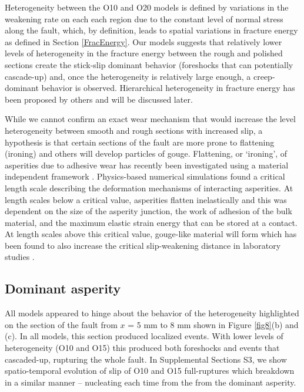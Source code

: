 \documentclass[preprint,1p, 10pt,authoryear]{elsarticle}
\begin{document}
Heterogeneity between the O10 and O20 models is defined by variations in the weakening rate on each each region due to the constant level of normal stress along the fault, which, by definition, leads to spatial variations in fracture energy as defined in Section \ref{FracEnergy}. Our models suggests that relatively lower levels of heterogeneity in the fracture energy between the rough and polished sections create the stick-slip dominant behavior (foreshocks that can potentially cascade-up) and, once the heterogeneity is relatively large enough, a creep-dominant behavior is observed. Hierarchical heterogeneity in fracture energy has been proposed by others \citep{Ide2005, Aochi2014, Aochi2017} and will be discussed later.

While we cannot confirm an exact wear mechanism that would increase the level heterogeneity between smooth and rough sections with increased slip, a hypothesis is that certain sections of the fault are more prone to flattening (ironing) and others will develop particles of gouge. Flattening, or ‘ironing’, of asperities due to adhesive wear has recently been investigated using a material independent framework \citet{Aghababaei2016}. Physics-based numerical simulations found a critical length scale describing the deformation mechanisms of interacting asperities. At length scales below a critical value, asperities flatten inelastically and this was dependent on the size of the asperity junction, the work of adhesion of the bulk material, and the maximum elastic strain energy that can be stored at a contact. At length scales above this critical value, gouge-like material will form which has been found to also increase the critical slip-weakening distance in laboratory studies \citep{Marone1998}.   

\subsection{Dominant asperity}
All models appeared to hinge about the behavior of the heterogeneity highlighted on the section of the fault from $x$ = 5 mm to 8 mm shown in Figure \ref{fig8}(b) and (c). In all models, this section produced localized events. With lower levels of heterogeneity (O10 and O15) this produced both foreshocks and events that cascaded-up, rupturing the whole fault. In Supplemental Sections S3, we show spatio-temporal evolution of slip of O10 and O15 full-ruptures which breakdown in a similar manner -- nucleating each time from the from the dominant asperity.
\end{document}
